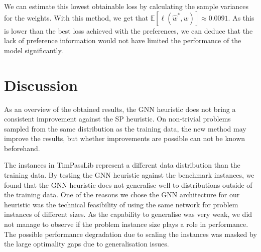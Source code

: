 \documentclass[english, 12pt, a4paper, sci, utf8, a-2b, online]{aaltothesis}
\begin{document}
We can estimate this lowest obtainable loss by calculating the sample variances for the weights. With this method, we get that $\mathbb{E}[\ell(\hat{w}^*, w)] \approx 0.0091$. As this is lower than the best loss achieved with the preferences, we can deduce that the lack of preference information would not have limited the performance of the model significantly.



\clearpage
\section{Discussion}
\label{sec:discussion}

As an overview of the obtained results, the GNN heuristic does not bring a consistent improvement against the SP heuristic. On non-trivial problems sampled from the same distribution as the training data, the new method may improve the results, but whether improvements are possible can not be known beforehand.

The instances in TimPassLib represent a different data distribution than the training data. By testing the GNN heuristic against the benchmark instances, we found that the GNN heuristic does not generalise well to distributions outside of the training data. One of the reasons we chose the GNN architecture for our heuristic was the technical feasibility of using the same network for problem instances of different sizes. As the capability to generalise was very weak, we did not manage to observe if the problem instance size plays a role in performance. The possible performance degradation due to scaling the instances was masked by the large optimality gaps due to generalisation issues.
\end{document}
